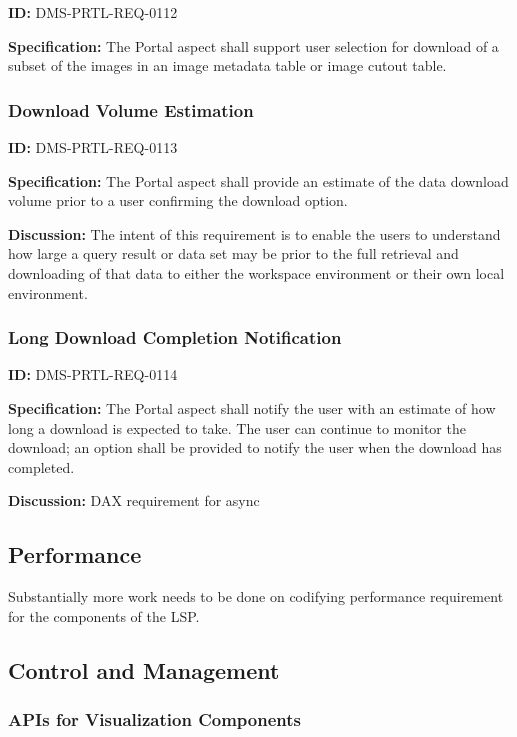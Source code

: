 \documentclass[SE,toc]{lsstdoc}
\begin{document}
\label{DMS-PRTL-REQ-0112}
\textbf{ID:} DMS-PRTL-REQ-0112

\textbf{Specification:}
The Portal aspect shall support user selection for download of a subset of the images in an image metadata table or image cutout table.

\subsubsection{Download Volume Estimation}

\label{DMS-PRTL-REQ-0113}
\textbf{ID:} DMS-PRTL-REQ-0113

\textbf{Specification:}
The Portal aspect shall provide an estimate of the data download volume prior to a user confirming the download option.

\textbf{Discussion:}
The intent of this requirement is to enable the users to understand how large a query result or data set may be prior to the full retrieval and downloading of that data to either the workspace environment or their own local environment.

\subsubsection{Long Download Completion Notification}

\label{DMS-PRTL-REQ-0114}
\textbf{ID:} DMS-PRTL-REQ-0114

\textbf{Specification:}
The Portal aspect shall notify the user with an estimate of how long a download is expected to take. The user can continue to monitor the download; an option shall be provided to notify the user when the download has completed.

\textbf{Discussion:}
DAX requirement for async

\subsection{Performance}

Substantially more work needs to be done on codifying performance requirement for the components of the LSP.

\subsection{Control and Management}

\subsubsection{APIs for Visualization Components}
\end{document}
